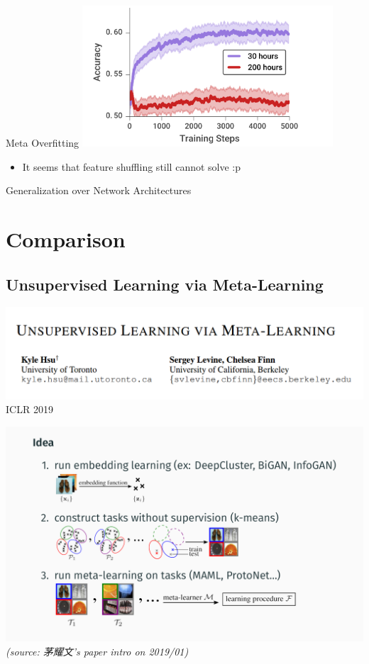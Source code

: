 \documentclass{beamer}
\begin{document}
\begin{frame}{Meta Overfitting}
  \center \includegraphics[width=0.7\textwidth]{fig/meta-overfitting.png}
  \begin{itemize}
    \item It seems that feature shuffling still cannot solve :p
  \end{itemize}
\end{frame}

\begin{frame}{Generalization over Network Architectures}
\end{frame}

\section{Comparison}
\subsection{Unsupervised Learning via Meta-Learning}

\begin{frame}
  \includegraphics[width=\textwidth]{fig/ULML.png}
  \center ICLR 2019
\end{frame}

\begin{frame}
  \includegraphics[width=\textwidth]{fig/ULML-flow.png}
  \textit{(source: 茅耀文's paper intro on 2019/01)}
\end{frame}
\end{document}
